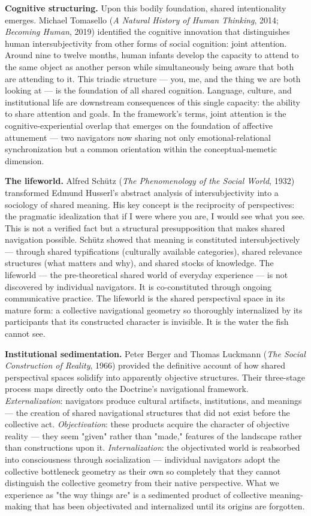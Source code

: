 \textbf{Cognitive structuring.} Upon this bodily foundation, shared intentionality emerges. Michael Tomasello (\textit{A Natural History of Human Thinking}, 2014; \textit{Becoming Human}, 2019) identified the cognitive innovation that distinguishes human intersubjectivity from other forms of social cognition: joint attention. Around nine to twelve months, human infants develop the capacity to attend to the same object as another person while simultaneously being aware that both are attending to it. This triadic structure — you, me, and the thing we are both looking at — is the foundation of all shared cognition. Language, culture, and institutional life are downstream consequences of this single capacity: the ability to share attention and goals. In the framework's terms, joint attention is the cognitive-experiential overlap that emerges on the foundation of affective attunement — two navigators now sharing not only emotional-relational synchronization but a common orientation within the conceptual-memetic dimension.


\textbf{The lifeworld.} Alfred Schütz (\textit{The Phenomenology of the Social World}, 1932) transformed Edmund Husserl's abstract analysis of intersubjectivity into a sociology of shared meaning. His key concept is the reciprocity of perspectives: the pragmatic idealization that if I were where you are, I would see what you see. This is not a verified fact but a structural presupposition that makes shared navigation possible. Schütz showed that meaning is constituted intersubjectively — through shared typifications (culturally available categories), shared relevance structures (what matters and why), and shared stocks of knowledge. The lifeworld — the pre-theoretical shared world of everyday experience — is not discovered by individual navigators. It is co-constituted through ongoing communicative practice. The lifeworld is the shared perspectival space in its mature form: a collective navigational geometry so thoroughly internalized by its participants that its constructed character is invisible. It is the water the fish cannot see.


\textbf{Institutional sedimentation.} Peter Berger and Thomas Luckmann (\textit{The Social Construction of Reality}, 1966) provided the definitive account of how shared perspectival spaces solidify into apparently objective structures. Their three-stage process maps directly onto the Doctrine's navigational framework. \textit{Externalization}: navigators produce cultural artifacts, institutions, and meanings — the creation of shared navigational structures that did not exist before the collective act. \textit{Objectivation}: these products acquire the character of objective reality — they seem "given" rather than "made," features of the landscape rather than constructions upon it. \textit{Internalization}: the objectivated world is reabsorbed into consciousness through socialization — individual navigators adopt the collective bottleneck geometry as their own so completely that they cannot distinguish the collective geometry from their native perspective. What we experience as "the way things are" is a sedimented product of collective meaning-making that has been objectivated and internalized until its origins are forgotten.


